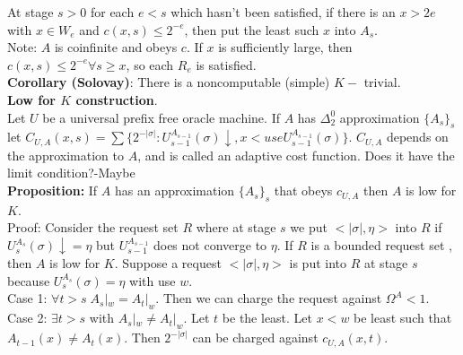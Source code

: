 \documentclass{article}
\begin{document}
  At stage $s>0$ for each $e<s$ which hasn't been satisfied, if there is an $x > 2e$ with $x \in W_e$ and $c(x,s) \leq 2^{-e}$, then put the least such $x$ into $A_s$.\\
  Note: $A$ is coinfinite and obeys $c$. If $x$ is sufficiently large, then $c(x,s) \leq 2^{-e} \forall s \geq x$, so each $R_e$ is satisfied.\\
  \textbf{Corollary (Solovay)}: There is a noncomputable (simple) $K-$ trivial.\\
  \textbf{Low for $K$ construction}. \\
  Let $U$ be a universal prefix free oracle machine. If $A$ has $\Delta^0_2$ approximation $\{A_s\}_s$ let $C_{U,A}(x,s) = \sum\{ 2^{-|\sigma|}: U_{s-1}^{A_{s-1}}(\sigma)\downarrow, x < use U_{s-1}^{A_{s-1}}(\sigma)\}$. $C_{U,A}$ depends on the approximation to $A$, and is called an adaptive cost function. Does it have the limit condition?-Maybe\\
  \textbf{Proposition:} If $A$ has an approximation $\{A_s\}_s$ that obeys $c_{U,A}$ then $A$ is low for $K$.\\
  Proof: Consider the request set $R$ where at stage $s$ we put $<|\sigma|, \eta>$ into $R$ if $U^{A_s}_s(\sigma) \downarrow = \eta$ but $U_{s-1}^{A_{s-1}}$ does not converge to $\eta$. If $R$ is a bounded request set , then $A$ is low for $K$. Suppose a request $<|\sigma|, \eta>$ is put into $R$ at stage $s$ because $U^{A_s}_s(\sigma) = \eta$ with use $w$. \\
  Case 1: $\forall t > s\;A_s|_w = A_t|_w$. Then we can charge the request against $\Omega^A<1$.\\
  Case 2: $\exists t> s $ with $A_s|_w \neq A_t|_w$. Let $t$ be the least. Let $x < w$ be least such that $A_{t-1}(x) \neq A_t(x)$. Then $2^{-|\sigma|}$ can be charged against $c_{U,A}(x,t)$.
  \newpage
\end{document}
